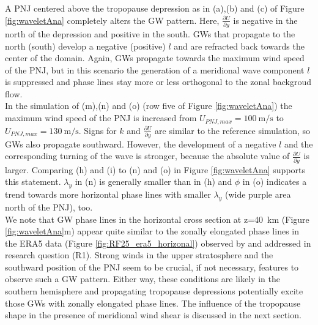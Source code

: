 A PNJ centered above the tropopause depression as in (a),(b) and (c) of Figure \ref{fig:waveletAna} completely alters the GW pattern. Here, $\frac{\partial U}{\partial y}$ is negative in the north of the depression and positive in the south. GWs that propagate to the north (south) develop a negative (positive) $l$ and are refracted back towards the center of the domain. Again, GWs propagate towards the maximum wind speed of the PNJ, but in this scenario the generation of a meridional wave component $l$ is suppressed and phase lines stay more or less orthogonal to the zonal backgroud flow. \\ %
In the simulation of (m),(n) and (o) (row five of Figure \ref{fig:waveletAna}) the maximum wind speed of the PNJ is increased from $U_{PNJ,max}=\SI{100}{\meter\per\second}$ to $U_{PNJ,max}=\SI{130}{\meter\per\second}$. Signs for $k$ and $\frac{\partial U}{\partial y}$ are similar to the reference simulation, so GWs also propagate southward. However, the development of a negative $l$ and the corresponding turning of the wave is stronger, because the absolute value of $\frac{\partial U}{\partial y}$ is larger. Comparing (h) and (i) to (n) and (o) in Figure \ref{fig:waveletAna} supports this statement. $\lambda_y$ in (n) is generally smaller than in (h) and $\phi$ in (o) indicates a trend towards more horizontal phase lines with smaller $\lambda_y$ (wide purple area north of the PNJ), too.\\
We note that GW phase lines in the horizontal cross section at z=\SI{40}{\kilo\meter} (Figure \ref{fig:waveletAna}m) appear quite similar to the zonally elongated phase lines in the ERA5 data (Figure \ref{fig:RF25_era5_horizonal}) observed by \textcite[]{dornbrack_stratospheric_2022} and addressed in research question (R1). Strong winds in the upper stratosphere and the southward position of the PNJ seem to be crucial, if not necessary, features to observe such a GW pattern. Either way, these conditions are likely in the southern hemisphere and propagating tropopause depressions potentially excite those GWs with zonally elongated phase lines. The influence of the tropopause shape in the presence of meridional wind shear is discussed in the next section.


